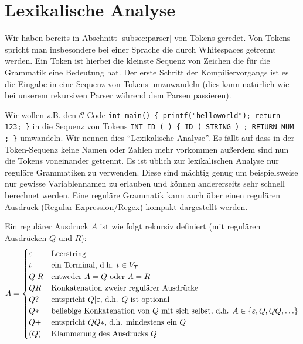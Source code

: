 \section{Lexikalische Analyse}
Wir haben bereits in Abschnitt \ref{subsec:parser} von Tokens geredet. Von Tokens spricht man insbesondere bei einer Sprache die durch Whitespaces getrennt werden. Ein Token ist hierbei die kleinste Sequenz von Zeichen die für die Grammatik eine Bedeutung hat.
Der erste Schritt der Kompiliervorgangs ist es die Eingabe in eine Sequenz von Tokens umzuwandeln (dies kann natürlich wie bei unserem rekursiven Parser während dem Parsen passieren).

Wir wollen z.B. den $\mathcal{C}$-Code \verb|int main() { printf("helloworld"); return 123; }| in die Sequenz von Tokens \verb|INT ID ( ) { ID ( STRING ) ; RETURN NUM ; }| umwandeln. Wir nennen dies ``Lexikalische Analyse''. Es fällt auf dass in der Token-Sequenz keine Namen oder Zahlen mehr vorkommen außerdem sind nun die Tokens
voneinander getrennt.
Es ist üblich zur lexikalischen Analyse nur reguläre Grammatiken zu verwenden. Diese sind mächtig genug um beispielsweise nur gewisse Variablennamen zu erlauben
und können andererseits sehr schnell berechnet werden.
Eine reguläre Grammatik kann auch über einen regulären Ausdruck (Regular Expression/Regex) kompakt dargestellt werden.

\begin{defn}
Ein regulärer Ausdruck $A$ ist wie folgt rekursiv definiert (mit regulären Ausdrücken $Q$ und $R$):
\[A = \begin{cases}
\varepsilon & \text{Leerstring} \\
t & \text{ein Terminal, d.h. $t \in V_T$} \\
Q|R & \text{entweder $A=Q$ oder $A=R$} \\
QR & \text{Konkatenation zweier regulärer Ausdrücke} \\
Q? & \text{entspricht $Q|\varepsilon$, d.h. $Q$ ist optional} \\
Q* & \text{beliebige Konkatenation von $Q$ mit sich selbst, d.h. $A \in \left\{\varepsilon,Q,QQ,\ldots\right\}$} \\
Q+ & \text{entspricht $QQ*$, d.h. mindestens ein $Q$} \\
(Q) & \text{Klammerung des Ausdrucks $Q$}
\end{cases}\]
\end{defn}

